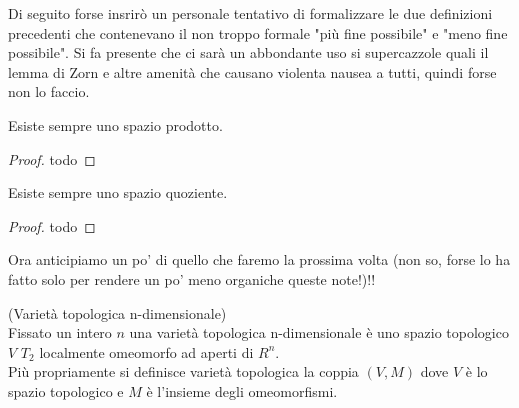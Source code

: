 Di seguito forse insrirò un personale tentativo di formalizzare le due definizioni precedenti che contenevano il non troppo formale "più fine possibile" e "meno fine possibile". 
Si fa presente che ci sarà un abbondante uso si supercazzole quali il lemma di Zorn e altre amenità che causano violenta nausea a tutti, quindi forse non lo faccio.


\begin{teo}
Esiste sempre uno spazio prodotto.
\end{teo}
\begin{proof}
todo
\end{proof}

\begin{teo}
Esiste sempre uno spazio quoziente.
\end{teo}
\begin{proof}
todo
\end{proof}



Ora anticipiamo un po' di quello che faremo la prossima volta (non so, forse lo ha fatto solo per rendere un po' meno organiche queste note!)!!



\begin{defn}
(Varietà topologica n-dimensionale)\\
Fissato un intero $n$ una varietà topologica n-dimensionale è uno spazio topologico $V$ $T_2$ localmente omeomorfo ad aperti di $R^n$.\\
Più propriamente si definisce varietà topologica la coppia $(V, M)$ dove $V$ è lo spazio topologico e $M$ è l'insieme degli omeomorfismi.\\ 
\end{defn}
